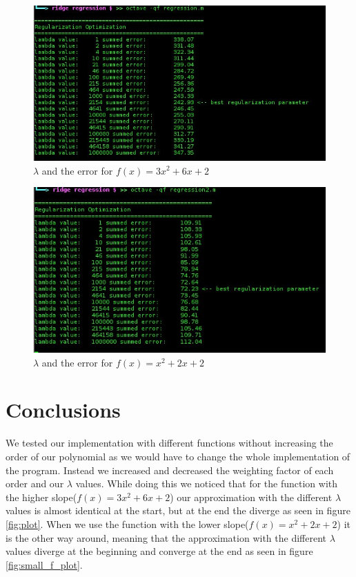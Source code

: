 \documentclass[12pt]{article}
\begin{document}
	\begin{figure}
		\centering
		\includegraphics[scale=0.7]{console_output_big_f}
		\caption{ $\lambda$ and the error for $f(x) = 3x^2 + 6x + 2$}
		\label{log_1}
	\end{figure}
	\begin{figure}
		\centering
		\includegraphics[scale=0.7]{console_output_small_f}
		\caption{ $\lambda$ and the error for $f(x) = x^2 + 2x + 2$}
		\label{log_2}
	\end{figure}

\section{Conclusions}
We tested our implementation with different functions without increasing the order of our polynomial as we would have to change the whole implementation of the program. Instead we increased and decreased the weighting factor of each order and our $\lambda$ values. While doing this we noticed that for the function with the higher slope($f(x) = 3x^2 + 6x + 2$) our approximation with the different $\lambda$ values is almost identical at the start, but at the end the diverge as seen in figure \ref{fig:plot}. When we use the function with the lower slope($f(x) = x^2 + 2x + 2$) it is the other way around, meaning that the approximation with the different $\lambda$ values diverge at the beginning and converge at the end as seen in figure \ref{fig:small_f_plot}.
\end{document}
